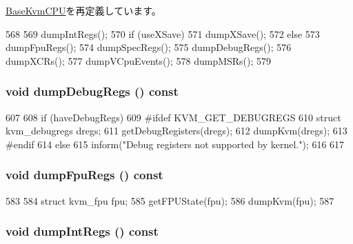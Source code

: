 \hyperlink{classBaseKvmCPU_accd2600060dbaee3a3b41aed4034c63c}{BaseKvmCPU}を再定義しています。


\begin{DoxyCode}
568 {
569     dumpIntRegs();
570     if (useXSave)
571         dumpXSave();
572     else
573         dumpFpuRegs();
574     dumpSpecRegs();
575     dumpDebugRegs();
576     dumpXCRs();
577     dumpVCpuEvents();
578     dumpMSRs();
579 }
\end{DoxyCode}
\hypertarget{classX86KvmCPU_a90a32da18747ec95f59f6042fa5b448d}{
\subsubsection[{dumpDebugRegs}]{\setlength{\rightskip}{0pt plus 5cm}void dumpDebugRegs () const}}
\label{classX86KvmCPU_a90a32da18747ec95f59f6042fa5b448d}



\begin{DoxyCode}
607 {
608     if (haveDebugRegs) {
609 #ifdef KVM_GET_DEBUGREGS
610         struct kvm_debugregs dregs;
611         getDebugRegisters(dregs);
612         dumpKvm(dregs);
613 #endif
614     } else {
615         inform("Debug registers not supported by kernel.\n");
616     }
617 }
\end{DoxyCode}
\hypertarget{classX86KvmCPU_aa1a18283b9b8e7cb68c16a67fec2259c}{
\subsubsection[{dumpFpuRegs}]{\setlength{\rightskip}{0pt plus 5cm}void dumpFpuRegs () const}}
\label{classX86KvmCPU_aa1a18283b9b8e7cb68c16a67fec2259c}



\begin{DoxyCode}
583 {
584     struct kvm_fpu fpu;
585     getFPUState(fpu);
586     dumpKvm(fpu);
587 }
\end{DoxyCode}
\hypertarget{classX86KvmCPU_af077d8e3ed2e320aa9a94718f0757a37}{
\subsubsection[{dumpIntRegs}]{\setlength{\rightskip}{0pt plus 5cm}void dumpIntRegs () const}}
\label{classX86KvmCPU_af077d8e3ed2e320aa9a94718f0757a37}



